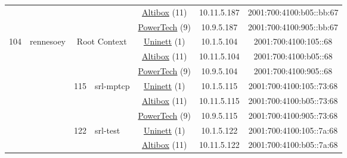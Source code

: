 \begin{small}
\begin{center}
\begin{longtable}{|c|c|c|c|c|c|c|c|}
  &  &  &  & \multicolumn{2}{|c|}{\tiny{\href{https://www.altibox.no}{Altibox} (11)}} & \tiny{10.11.5.187} & \tiny{2001:700:4100:b05::bb:67} \\* \cline{5-5}\cline{6-6}\cline{7-7}\cline{8-8}
  &  &  &  & \multicolumn{2}{|c|}{\tiny{\href{http://www.powertech.no}{PowerTech} (9)}} & \tiny{10.9.5.187} & \tiny{2001:700:4100:905::bb:67} \\ \hline
 \multirow{48}{*}{\tiny{104}} & \multicolumn{1}{|l|}{\multirow{48}{*}{\tiny{rennesoey}}} & \multicolumn{2}{|c|}{\multirow{3}{*}{\tiny{Root Context}}} & \multicolumn{2}{|c|}{\tiny{\href{https://www.uninett.no}{Uninett} (1)}} & \tiny{10.1.5.104} & \tiny{2001:700:4100:105::68} \\* \cline{5-5}\cline{6-6}\cline{7-7}\cline{8-8}
  &  & \multicolumn{2}{|c|}{} & \multicolumn{2}{|c|}{\tiny{\href{https://www.altibox.no}{Altibox} (11)}} & \tiny{10.11.5.104} & \tiny{2001:700:4100:b05::68} \\* \cline{5-5}\cline{6-6}\cline{7-7}\cline{8-8}
  &  & \multicolumn{2}{|c|}{} & \multicolumn{2}{|c|}{\tiny{\href{http://www.powertech.no}{PowerTech} (9)}} & \tiny{10.9.5.104} & \tiny{2001:700:4100:905::68} \\* \cline{3-3}\cline{4-4}\cline{5-5}\cline{6-6}\cline{7-7}\cline{8-8}
  &  & \multirow{3}{*}{\tiny{115}} & \multicolumn{1}{|l|}{\multirow{3}{*}{\tiny{srl-mptcp}}} & \multicolumn{2}{|c|}{\tiny{\href{https://www.uninett.no}{Uninett} (1)}} & \tiny{10.1.5.115} & \tiny{2001:700:4100:105::73:68} \\* \cline{5-5}\cline{6-6}\cline{7-7}\cline{8-8}
  &  &  &  & \multicolumn{2}{|c|}{\tiny{\href{https://www.altibox.no}{Altibox} (11)}} & \tiny{10.11.5.115} & \tiny{2001:700:4100:b05::73:68} \\* \cline{5-5}\cline{6-6}\cline{7-7}\cline{8-8}
  &  &  &  & \multicolumn{2}{|c|}{\tiny{\href{http://www.powertech.no}{PowerTech} (9)}} & \tiny{10.9.5.115} & \tiny{2001:700:4100:905::73:68} \\* \cline{3-3}\cline{4-4}\cline{5-5}\cline{6-6}\cline{7-7}\cline{8-8}
  &  & \multirow{3}{*}{\tiny{122}} & \multicolumn{1}{|l|}{\multirow{3}{*}{\tiny{srl-test}}} & \multicolumn{2}{|c|}{\tiny{\href{https://www.uninett.no}{Uninett} (1)}} & \tiny{10.1.5.122} & \tiny{2001:700:4100:105::7a:68} \\* \cline{5-5}\cline{6-6}\cline{7-7}\cline{8-8}
  &  &  &  & \multicolumn{2}{|c|}{\tiny{\href{https://www.altibox.no}{Altibox} (11)}} & \tiny{10.11.5.122} & \tiny{2001:700:4100:b05::7a:68} \\* \cline{5-5}\cline{6-6}\cline{7-7}\cline{8-8}

\end{longtable}
\end{center}
\end{small}

